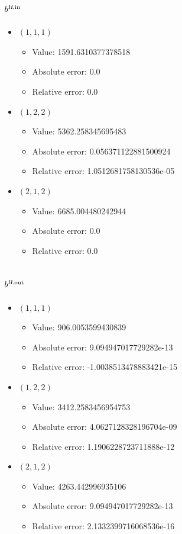 \documentclass{article}%
\begin{document}
\subsection{$b^{\textsl{H},\text{in}}$}%
\begin{itemize}%
	\item $(1, 1, 1)$%
	\begin{itemize}%
		\item Value: 1591.6310377378518%
		\item Absolute error: 0.0%
		\item Relative error: 0.0%
	\end{itemize}%
	\item $(1, 2, 2)$%
	\begin{itemize}%
		\item Value: 5362.258345695483%
		\item Absolute error: 0.056371122881500924%
		\item Relative error: 1.0512681758130536e-05%
	\end{itemize}%
	\item $(2, 1, 2)$%
	\begin{itemize}%
		\item Value: 6685.004480242944%
		\item Absolute error: 0.0%
		\item Relative error: 0.0%
	\end{itemize}%
\end{itemize}%
\subsection{$b^{\textsl{H},\text{out}}$}%
\begin{itemize}%
	\item $(1, 1, 1)$%
	\begin{itemize}%
		\item Value: 906.0053599430839%
		\item Absolute error: 9.094947017729282e-13%
		\item Relative error: -1.0038513478883421e-15%
	\end{itemize}%
	\item $(1, 2, 2)$%
	\begin{itemize}%
		\item Value: 3412.2583456954753%
		\item Absolute error: 4.0627128328196704e-09%
		\item Relative error: 1.1906228723711888e-12%
	\end{itemize}%
	\item $(2, 1, 2)$%
	\begin{itemize}%
		\item Value: 4263.442996935106%
		\item Absolute error: 9.094947017729282e-13%
		\item Relative error: 2.1332399716068536e-16%
	\end{itemize}%
\end{itemize}%
\end{document}
